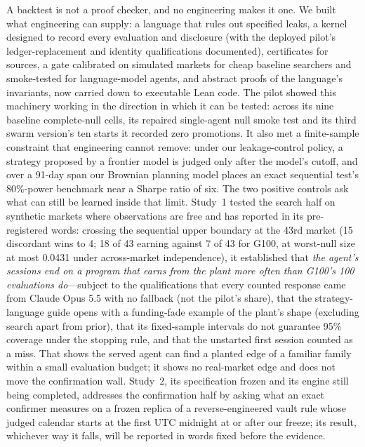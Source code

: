 \documentclass[11pt]{article}
\begin{document}
A backtest is not a proof checker, and no engineering makes it one. We built what engineering can supply: a language that rules out specified leaks, a kernel designed to record every evaluation and disclosure (with the deployed pilot's ledger-replacement and identity qualifications documented), certificates for sources, a gate calibrated on simulated markets for cheap baseline searchers and smoke-tested for language-model agents, and abstract proofs of the language's invariants, now carried down to executable Lean code. The pilot showed this machinery working in the direction in which it can be tested: across its nine baseline complete-null cells, its repaired single-agent null smoke test and its third swarm version's ten starts it recorded zero promotions. It also met a finite-sample constraint that engineering cannot remove: under our leakage-control policy, a strategy proposed by a frontier model is judged only after the model's cutoff, and over a 91-day span our Brownian planning model places an exact sequential test's 80\%-power benchmark near a Sharpe ratio of six. The two positive controls ask what can still be learned inside that limit. Study~1 tested the search half on synthetic markets where observations are free and has reported in its pre-registered words: crossing the sequential upper boundary at the 43rd market (15 discordant wins to 4; 18 of 43 earning against 7 of 43 for G100, at worst-null size at most 0.0431 under across-market independence), it established that \emph{the agent's sessions end on a program that earns from the plant more often than G100's 100 evaluations do}---subject to the qualifications that every counted response came from Claude Opus 5.5 with no fallback (not the pilot's share), that the strategy-language guide opens with a funding-fade example of the plant's shape (excluding search apart from prior), that its fixed-sample intervals do not guarantee 95\% coverage under the stopping rule, and that the unstarted first session counted as a miss. That shows the served agent can find a planted edge of a familiar family within a small evaluation budget; it shows no real-market edge and does not move the confirmation wall. Study~2, its specification frozen and its engine still being completed, addresses the confirmation half by asking what an exact confirmer measures on a frozen replica of a reverse-engineered vault rule whose judged calendar starts at the first UTC midnight at or after our freeze; its result, whichever way it falls, will be reported in words fixed before the evidence.
\end{document}
